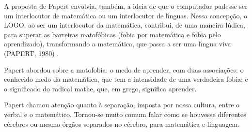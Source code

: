 \documentclass[
12pt,		%
openright,	%
twoside,  %
a4paper,			%
chapter=TITLE,		%
english,			%
french,				%
spanish,			%
brazil				%
]{USPSC-classe/USPSC}
\begin{document}
A proposta de Papert envolvia, tamb\'em, a ideia de que o computador pudesse ser um interlocutor  de matem\'atica ou um interlocutor de l\'{\i}nguas. Nessa concep\c{c}\~ao, o LOGO, ao ser um interlocutor da matem\'atica, contribui, de uma maneira l\'udica, para superar as barreiras matof\'obicas (fobia por matem\'atica e fobia pelo aprendizado), transformando a matem\'atica, que passa a ser uma l\'{\i}ngua viva  (PAPERT, 1980) .








Papert abordou sobre a \textquotedbl matofobia: o medo de aprender\textquotedbl , com duas associa\c{c}\~oes: o conhecido medo da matem\'atica, que tem a intensidade de uma verdadeira fobia; e o  significado do radical mathe, que, em grego, significa aprender.









\noindent\begin{center}\mbox{\centering{}}\end{center}


Papert chamou aten\c{c}\~ao quanto \`a separa\c{c}\~ao, imposta por nossa cultura, entre o verbal e o matem\'atico. Tornou-se muito comum falar como se houvesse diferentes c\'erebros ou mesmo \'org\~aos separados no c\'erebro, para matem\'atica e linguagem.
\end{document}
